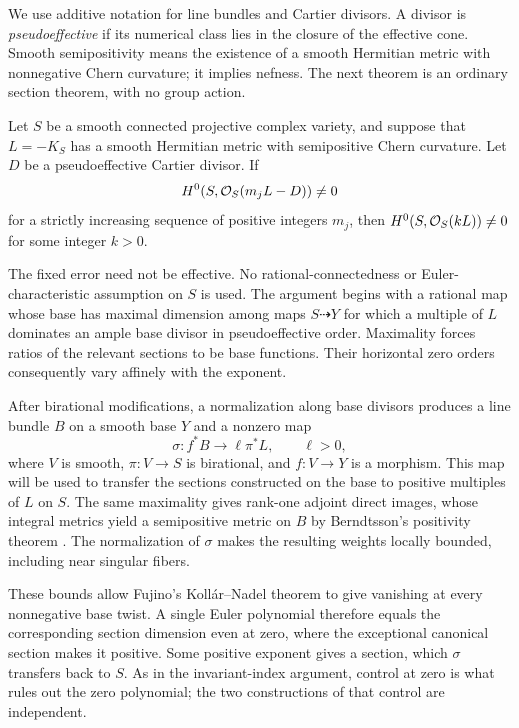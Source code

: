 We use additive notation for line bundles and Cartier divisors. A divisor
is \emph{pseudoeffective} if its numerical class lies in the closure of
the effective cone. Smooth semipositivity means the existence of a smooth
Hermitian metric with nonnegative Chern curvature; it implies nefness.
The next theorem is an ordinary section theorem, with no group action.

\begin{theorem}\label{thm:conversion}
Let \(S\) be a smooth connected projective complex variety, and suppose
that \(L=-K_S\) has a smooth Hermitian metric with semipositive Chern
curvature. Let \(D\) be a pseudoeffective Cartier divisor. If
\[
H^0(S,\mathcal O_S(m_jL-D))\ne0
\]
for a strictly increasing sequence of positive integers \(m_j\), then
\(H^0(S,\mathcal O_S(kL))\ne0\) for some integer \(k>0\).
\end{theorem}

The fixed error need not be effective. No rational-connectedness or
Euler-characteristic assumption on \(S\) is used. The argument begins
with a rational map whose base has maximal dimension among maps
\(S\dashrightarrow Y\) for which a multiple of \(L\) dominates an
ample base divisor in pseudoeffective order. Maximality forces ratios
of the relevant sections to be base functions. Their horizontal zero
orders consequently vary affinely with the exponent.

After birational modifications, a normalization along base divisors
produces a line bundle \(B\) on a smooth base \(Y\) and a nonzero map
\[
\sigma:f^*B\longrightarrow\ell\pi^*L,\qquad \ell>0,
\]
where \(V\) is smooth, \(\pi:V\to S\) is birational, and
\(f:V\to Y\) is a morphism. This map will be used to transfer the
sections constructed on the base to positive multiples of \(L\) on
\(S\). The same maximality gives
rank-one adjoint direct images, whose integral metrics yield a
semipositive metric on \(B\) by Berndtsson's positivity theorem
\cite{Berndtsson2009}. The normalization of \(\sigma\) makes the
resulting weights locally bounded, including near singular fibers.

These bounds allow Fujino's Koll\'ar--Nadel theorem \cite{Fujino2018}
to give vanishing at every nonnegative base twist. A single Euler
polynomial therefore equals the corresponding section dimension even
at zero, where the exceptional canonical section makes it positive.
Some positive exponent gives a section, which \(\sigma\) transfers
back to \(S\). As in the invariant-index argument, control at zero
is what rules out the zero polynomial; the two constructions of that
control are independent.


